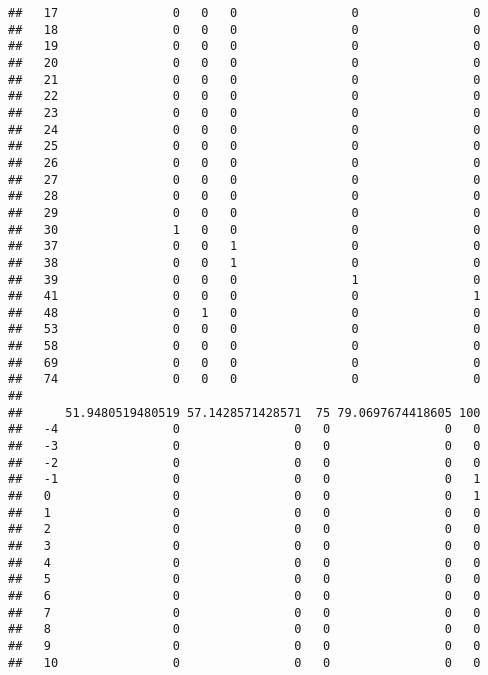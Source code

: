 \documentclass[]{article}
\begin{document}
\begin{verbatim}
##   17                0   0   0                0                0
##   18                0   0   0                0                0
##   19                0   0   0                0                0
##   20                0   0   0                0                0
##   21                0   0   0                0                0
##   22                0   0   0                0                0
##   23                0   0   0                0                0
##   24                0   0   0                0                0
##   25                0   0   0                0                0
##   26                0   0   0                0                0
##   27                0   0   0                0                0
##   28                0   0   0                0                0
##   29                0   0   0                0                0
##   30                1   0   0                0                0
##   37                0   0   1                0                0
##   38                0   0   1                0                0
##   39                0   0   0                1                0
##   41                0   0   0                0                1
##   48                0   1   0                0                0
##   53                0   0   0                0                0
##   58                0   0   0                0                0
##   69                0   0   0                0                0
##   74                0   0   0                0                0
##     
##      51.9480519480519 57.1428571428571  75 79.0697674418605 100
##   -4                0                0   0                0   0
##   -3                0                0   0                0   0
##   -2                0                0   0                0   0
##   -1                0                0   0                0   1
##   0                 0                0   0                0   1
##   1                 0                0   0                0   0
##   2                 0                0   0                0   0
##   3                 0                0   0                0   0
##   4                 0                0   0                0   0
##   5                 0                0   0                0   0
##   6                 0                0   0                0   0
##   7                 0                0   0                0   0
##   8                 0                0   0                0   0
##   9                 0                0   0                0   0
##   10                0                0   0                0   0

\end{verbatim}
\end{document}
